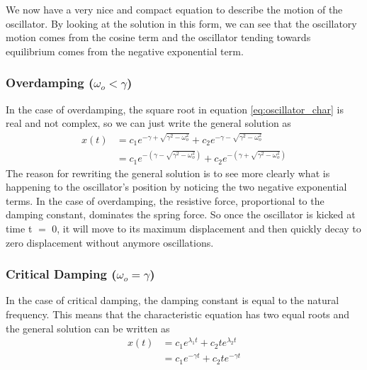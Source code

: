 \documentclass{article}
\newcommand{\be}{\begin{equation}}
\newcommand{\ee}{\end{equation}}
\begin{document}
We now have a very nice and compact equation to describe the motion of the oscillator.
By looking at the solution in this form, we can see that the oscillatory motion comes from the cosine term and the oscillator tending towards equilibrium comes from the negative exponential term.

\subsubsection*{Overdamping ($\omega_o < \gamma$)}
In the case of overdamping, the square root in equation \ref{eq:oscillator_char} is real and not complex, so we can just write the general solution as
\be
\begin{split}
x(t) &= c_1 e^{-\gamma + \sqrt{\gamma^2 - \omega_o^2}} + c_2 e^{-\gamma - \sqrt{\gamma^2 - \omega_o^2}} \\
&= c_1 e^{-(\gamma - \sqrt{\gamma^2 - \omega_o^2})} + c_2 e^{-(\gamma + \sqrt{\gamma^2 - \omega_o^2})}
\end{split}
\ee
The reason for rewriting the general solution is to see more clearly what is happening to the oscillator's position by noticing the two negative exponential terms.
In the case of overdamping, the resistive force, proportional to the damping constant, dominates the spring force.
So once the oscillator is kicked at time t $=$ 0, it will move to its maximum displacement and then quickly decay to zero displacement without anymore oscillations.

\subsubsection*{Critical Damping ($\omega_o = \gamma$)}
In the case of critical damping, the damping constant is equal to the natural frequency.
This means that the characteristic equation has two equal roots and the general solution can be written as
\be
\begin{split}
x(t) &= c_1 e^{\lambda_1 t} + c_2 te^{\lambda_2 t}\\
&= c_1 e^{-\gamma t} + c_2 te^{-\gamma t}\\
\end{split}
\ee
\end{document}
